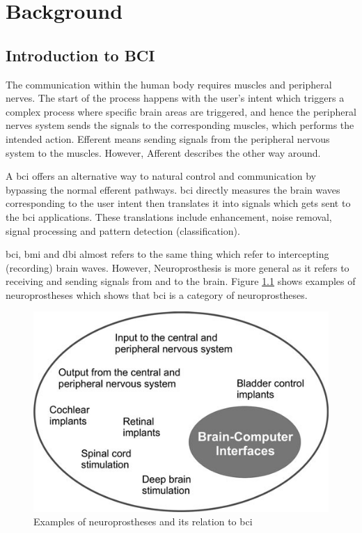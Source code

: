 \chapter{Background}
\label{chap:background}
\section{Introduction to BCI}
The communication within the human body requires muscles and  peripheral nerves. The start of the process happens with  the user's intent which triggers a complex process where specific brain areas are triggered, and hence the peripheral nerves system sends the signals to the corresponding muscles, which performs the intended action. Efferent means sending signals from the peripheral nervous system to the muscles. However, Afferent describes the other way around. \cite{inbook1}\par
A \ac{bci} offers an alternative way to natural control and communication by bypassing the normal efferent pathways. \ac{bci} directly measures the brain waves corresponding to the user intent then translates it into signals which gets sent to the \ac{bci} applications. These translations include enhancement, noise removal, signal processing and pattern detection (classification). \cite{inbook1}\par
\ac{bci}, \ac{bmi} and \ac{dbi} almost refers to the same thing which refer to intercepting (recording) brain waves. However, Neuroprosthesis is more general as it refers to receiving and sending signals from and to the brain. Figure \ref{fig:neuroprostheses} shows examples of neuroprostheses which shows that \ac{bci} is a category of neuroprostheses.\par
\begin{figure}
    \centering
    \includegraphics[width=\figureWidth]{images/background/neuroprostheses.jpg}
    \caption{Examples of neuroprostheses and its relation to \ac{bci} \cite{inbook1}}
    \label{fig:neuroprostheses}
\end{figure}
